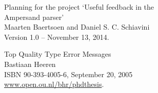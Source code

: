 \label{sec:bibliography}

\begin{thebibliography}{99}

	Planning for the project `Useful feedback in the\\ Ampersand parser'\\
	Maarten Baertsoen and Daniel S. C. Schiavini\\
	Version 1.0 -- November 13, 2014.

	Top Quality Type Error Messages\\
	Bastiaan Heeren\\
	ISBN 90-393-4005-6, September 20, 2005\\
	\url{www.open.ou.nl/bhr/phdthesis}.

\end{thebibliography}